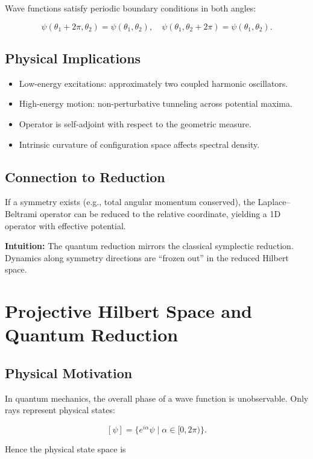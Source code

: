 \documentclass[11pt]{book}
\begin{document}
Wave functions satisfy periodic boundary conditions in both angles:

\[
\psi(\theta_1+2\pi,\theta_2) = \psi(\theta_1,\theta_2),\quad
\psi(\theta_1,\theta_2+2\pi) = \psi(\theta_1,\theta_2).
\]

\section{Physical Implications}

\begin{itemize}
    \item Low-energy excitations: approximately two coupled harmonic oscillators.
    \item High-energy motion: non-perturbative tunneling across potential maxima.
    \item Operator is self-adjoint with respect to the geometric measure.
    \item Intrinsic curvature of configuration space affects spectral density.
\end{itemize}

\section{Connection to Reduction}

If a symmetry exists (e.g., total angular momentum conserved), the Laplace--Beltrami operator can be reduced to the relative coordinate, yielding a 1D operator with effective potential.

\textbf{Intuition:} The quantum reduction mirrors the classical symplectic reduction. Dynamics along symmetry directions are “frozen out” in the reduced Hilbert space.


\chapter{Projective Hilbert Space and Quantum Reduction}

\section{Physical Motivation}

In quantum mechanics, the overall phase of a wave function is unobservable. Only rays represent physical states:

\[
[\psi] = \{ e^{i\alpha} \psi \mid \alpha \in [0,2\pi) \}.
\]

Hence the physical state space is
\end{document}
